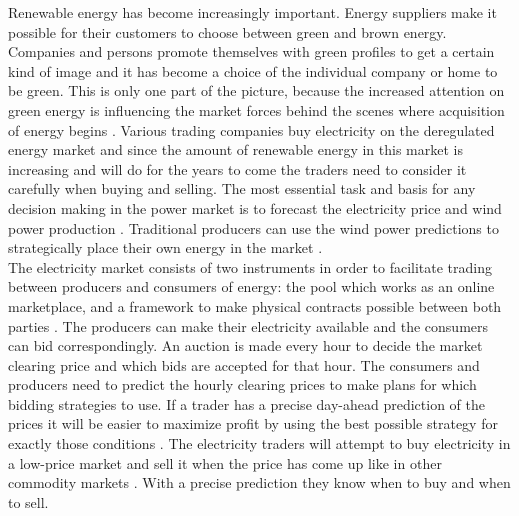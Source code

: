 Renewable energy has become increasingly important. Energy suppliers make it possible for their customers to choose between green and brown energy. Companies and persons promote themselves with green profiles to get a certain kind of image and it has become a choice of the individual company or home to be green. This is only one part of the picture, because the increased attention on green energy is influencing the market forces behind the scenes where acquisition of energy begins \cite{windPowerDanishLiberalized}. Various trading companies buy electricity on the deregulated energy market and since the amount of renewable energy in this market is increasing and will do for the years to come\cite{6, windPowerDanishLiberalized} the traders need to consider it carefully when buying and selling. The most essential task and basis for any decision making in the power market is to forecast the electricity price \cite{pjmForecast} and wind power production \cite{dayAheadImpactOfWindPowerForecasts}. Traditional producers can use the wind power predictions to strategically place their own energy in the market \cite{21}.
\\[0.5cm]
The electricity market consists of two instruments in order to facilitate trading between producers and consumers of energy: the pool which works as an online marketplace, and a framework to make physical contracts possible between both parties \cite{21}. The producers can make their electricity available and the consumers can bid correspondingly. An auction is made every hour to decide the market clearing price and which bids are accepted for that hour. The consumers and producers need to predict the hourly clearing prices to make plans for which bidding strategies to use. If a trader has a precise day-ahead prediction of the prices it will be easier to maximize profit by using the best possible strategy for exactly those conditions \cite{21}. The electricity traders will attempt to buy electricity in a low-price market and sell it when the price has come up like in other commodity markets \cite{FIND REF}. With a precise prediction they know when to buy and when to sell. 

